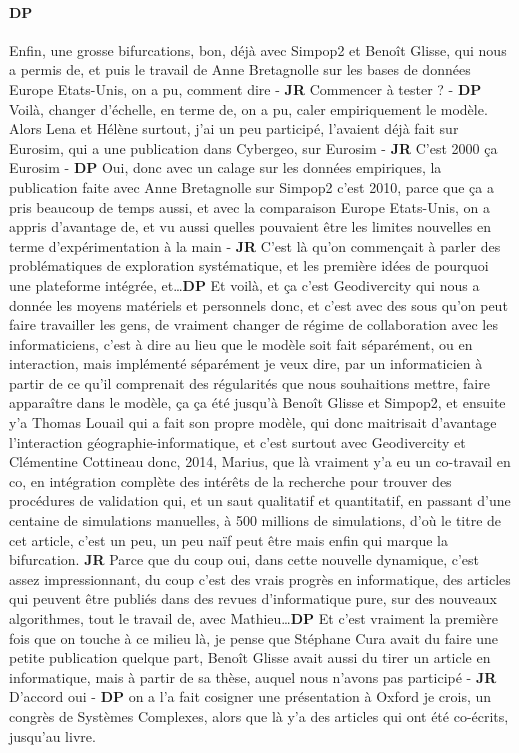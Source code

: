 \documentclass[12pt]{article}
\begin{document}
\paragraph{DP}

Enfin, une grosse bifurcations, bon, déjà avec Simpop2 et Benoît Glisse, qui nous a permis de, et puis le travail de Anne Bretagnolle sur les bases de données Europe Etats-Unis, on a pu, comment dire - \textbf{JR} Commencer à tester ? - \textbf{DP} Voilà, changer d'échelle, en terme de, on a pu, caler empiriquement le modèle. Alors Lena et Hélène surtout, j'ai un peu participé, l'avaient déjà fait sur Eurosim, qui a une publication dans Cybergeo, sur Eurosim - \textbf{JR} C'est 2000 ça Eurosim - \textbf{DP} Oui, donc avec un calage sur les données empiriques, la publication faite avec Anne Bretagnolle sur Simpop2 c'est 2010, parce que ça a pris beaucoup de temps aussi, et avec la comparaison Europe Etats-Unis, on a appris d'avantage de, et vu aussi quelles pouvaient être les limites nouvelles en terme d'expérimentation à la main - \textbf{JR} C'est là qu'on commençait à parler des problématiques de exploration systématique, et les première idées de pourquoi une plateforme intégrée, et\ldots \textbf{DP} Et voilà, et ça c'est Geodivercity qui nous a donnée les moyens matériels et personnels donc, et c'est avec des sous qu'on peut faire travailler les gens, de vraiment changer de régime de collaboration avec les informaticiens, c'est à dire au lieu que le modèle soit fait séparément, ou en interaction, mais implémenté séparément je veux dire, par un informaticien à partir de ce qu'il comprenait des régularités que nous souhaitions mettre, faire apparaître dans le modèle, ça ça été jusqu'à Benoît Glisse et Simpop2, et ensuite y'a Thomas Louail qui a fait son propre modèle, qui donc maitrisait d'avantage l'interaction géographie-informatique, et c'est surtout avec Geodivercity et Clémentine Cottineau donc, 2014, Marius, que là vraiment y'a eu un co-travail en co, en intégration complète des intérêts de la recherche pour trouver des procédures de validation qui, et un saut qualitatif et quantitatif, en passant d'une centaine de simulations manuelles, à 500 millions de simulations, d'où le titre de cet article, c'est un peu, un peu naïf peut être mais enfin qui marque la bifurcation. \textbf{JR} Parce que du coup oui, dans cette nouvelle dynamique, c'est assez impressionnant, du coup c'est des vrais progrès en informatique, des articles qui peuvent être publiés dans des revues d'informatique pure, sur des nouveaux algorithmes, tout le travail de, avec Mathieu\ldots \textbf{DP} Et c'est vraiment la première fois %
que on touche à ce milieu là, je pense que Stéphane Cura avait du faire une petite publication quelque part, Benoît Glisse avait aussi du tirer un article en informatique, mais à partir de sa thèse, auquel nous n'avons pas participé - \textbf{JR} D'accord oui - \textbf{DP} on a l'a fait cosigner une présentation à Oxford je crois, un congrès de Systèmes Complexes, alors que là y'a des articles qui ont été co-écrits, jusqu'au livre.
\end{document}
